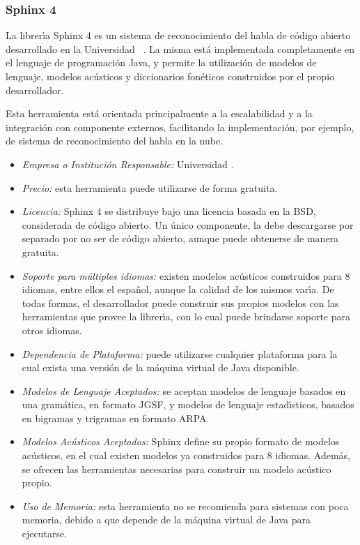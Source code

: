 \subsubsection{Sphinx 4}
\label{sec:sphinx}

La librer{\'\i}a Sphinx 4 es un sistema de reconocimiento del habla de c\'odigo abierto desarrollado en
la Universidad \mbox{ \cite{Sphinx4}}. La misma est\'a implementada
completamente en el lenguaje de programaci\'on Java, y permite la utilizaci\'on de modelos de lenguaje,
modelos ac\'usticos y diccionarios fon\'eticos construidos por el propio desarrollador.

Esta herramienta est\'a orientada principalmente a la escalabilidad y a la integraci\'on con
componente externos, facilitando la implementaci\'on, por ejemplo, de sistema de reconocimiento del
habla en la nube.

\begin{itemize}
	\item \emph{Empresa o Instituci\'on Responsable:} Universidad .
	\item \emph{Precio:} esta herramienta puede utilizarse de forma gratuita.
	\item \emph{Licencia:} Sphinx 4 se distribuye bajo una licencia basada en la BSD, considerada
	de c\'odigo abierto. Un \'unico componente, la  debe descargarse por
	separado por no ser de c\'odigo abierto, aunque puede obtenerse de manera gratuita.
	\item \emph{Soporte para m\'ultiples idiomas:} existen modelos ac\'usticos construidos para
	8 idiomas, entre ellos el espa\~nol, aunque la calidad de los mismos var{\'\i}a.
	De todas formas, el desarrollador puede construir sus propios modelos con las herramientas
	que provee la librer{\'\i}a, con lo cual puede brindarse soporte para otros idiomas.
	\item \emph{Dependencia de Plataforma:} puede utilizarse cualquier plataforma para la cual
	exista una versi\'on de la m\'aquina virtual de Java disponible.
	\item \emph{Modelos de Lenguaje Aceptados:} se aceptan modelos de lenguaje basados en una
	gram\'atica, en formato JGSF, y modelos de lenguaje estad{\'\i}sticos, basados en bigramas y
	trigramas en formato ARPA.
	\item \emph{Modelos Ac\'usticos Aceptados:} Sphinx define su propio formato de modelos ac\'usticos,
	en el cual existen modelos ya construidos para 8 idiomas. Adem\'as, se ofrecen las herramientas
	necesarias para construir un modelo ac\'ustico propio.
	\item \emph{Uso de Memoria:} esta herramienta no se recomienda para sistemas con poca memoria,
	debido a que depende de la m\'aquina virtual de Java para ejecutarse.
\end{itemize}
